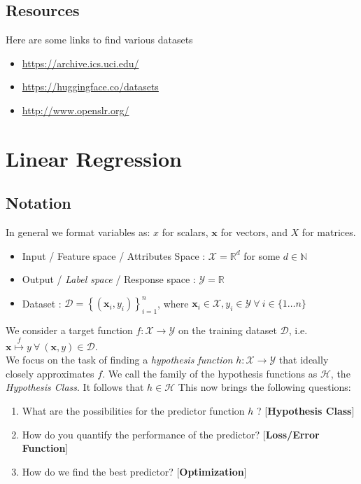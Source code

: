 \documentclass{report}
\newcommand{\x}{\mathbf{x}}
\begin{document}
\section{Resources}
Here are some links to find various datasets
\begin{itemize}
  \item \href{https://archive.ics.uci.edu/}{https://archive.ics.uci.edu/}
  \item \href{https://huggingface.co/datasets}{https://huggingface.co/datasets}
  \item \href{http://www.openslr.org/}{http://www.openslr.org/}
\end{itemize}


\chapter{Linear Regression}

\section{Notation}

In general we format variables as: $x$ for scalars, $\x$ for vectors, and $X$ for matrices.
\begin{itemize}
  \item Input / Feature space / Attributes Space :  \( \mathcal{X} =  \mathbb{R}^d\) for some \(d\in\mathbb{N}\)
  \item Output / \emph{Label space} / Response space : \( \mathcal{Y}= \mathbb{R} \)
  \item Dataset : \( \mathcal{D} = \left\{(\textbf{x}_i,y_i)\right\}_{i=1}^{n} \), where \(\textbf{x}_i \in \mathcal{X}, y_i \in \mathcal{Y} \ \forall \ i \in \{1\ldots n\}\)
\end{itemize}

We consider a target function $f : \mathcal{X} \to \mathcal{Y}$ on the training dataset $\mathcal{D}$, i.e. $\textbf{x} \overset{f}{\mapsto} y \ \forall \ (\x,y) \in \mathcal{D}$. \\

We focus on the task of finding a \emph{hypothesis function} \(h : \mathcal{X} \to \mathcal{Y}\) that ideally closely approximates \(f\). We call the family of the hypothesis functions as \(\mathcal{H}\), the \emph{Hypothesis Class}. It follows that \(h \in \mathcal{H}\)
This now brings the following questions:
\begin{enumerate}
  \item What are the possibilities for the predictor function \(h\) ? [\textbf{Hypothesis Class}]
  \item How do you quantify the performance of the predictor? [\textbf{Loss/Error Function}]
  \item How do we find the best predictor? [\textbf{Optimization}]
\end{enumerate}
\end{document}
